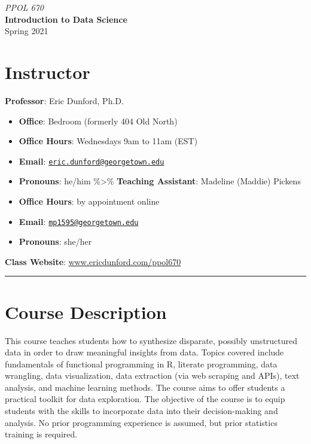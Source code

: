 \documentclass[
  12pt,
]{article}
\author{}
\date{\vspace{-2.5em}}
\begin{document}
\begin{center}
 

\huge \textit{PPOL 670}\\
\huge\textbf{Introduction to Data Science}\\

\Large Spring 2021
\end{center}

\hypertarget{instructor}{%
\section{Instructor}\label{instructor}}

\textbf{Professor}: Eric Dunford, Ph.D.

\begin{itemize}
\item
  \textbf{Office}: Bedroom (formerly 404 Old North)
\item
  \textbf{Office Hours}: Wednesdays 9am to 11am (EST)
\item
  \textbf{Email}:
  \href{mailto:eric.dunford@georgetown.edu}{\nolinkurl{eric.dunford@georgetown.edu}}
\item
  \textbf{Pronouns}: he/him \%\textgreater\% \textbf{Teaching
  Assistant}: Madeline (Maddie) Pickens
\item
  \textbf{Office Hours}: by appointment online
\item
  \textbf{Email}:
  \href{mailto:mp1595@georgetown.edu}{\nolinkurl{mp1595@georgetown.edu}}
\item
  \textbf{Pronouns}: she/her
\end{itemize}

\textbf{Class Website}: \url{www.ericdunford.com/ppol670}

\begin{center}\rule{0.5\linewidth}{0.5pt}\end{center}

\hypertarget{course-description}{%
\section{Course Description}\label{course-description}}

This course teaches students how to synthesize disparate, possibly
unstructured data in order to draw meaningful insights from data. Topics
covered include fundamentals of functional programming in R, literate
programming, data wrangling, data visualization, data extraction (via
web scraping and APIs), text analysis, and machine learning methods. The
course aims to offer students a practical toolkit for data exploration.
The objective of the course is to equip students with the skills to
incorporate data into their decision-making and analysis. No prior
programming experience is assumed, but prior statistics training is
required.
\end{document}
